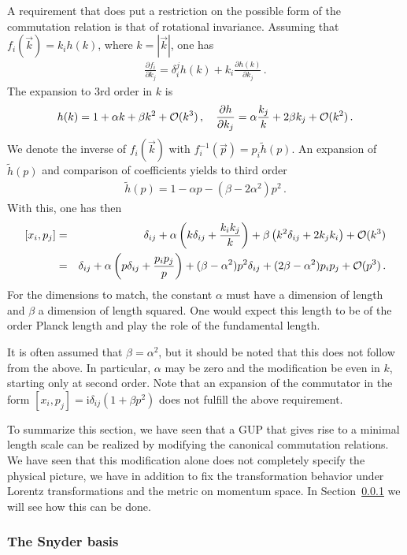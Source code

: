 \documentclass{article}
\def\beqn{\begin{eqnarray}}
\def\eeqn{\end{eqnarray}}
\begin{document}
A requirement that does put a restriction on the possible form of the commutation relation is that 
of rotational invariance. Assuming that $f_i(\vec k) = k_i h(k)$, where $k = |\vec k|$, one has
\beqn
\frac{\partial f_i}{\partial k_j} = \delta_i^j h(k) + k_i \frac{\partial h (k)}{\partial k_j} \,.
\eeqn 
The expansion to 3rd order in $k$ is
\beqn
 h(k) = 1 + \alpha k + \beta k^2 + {\cal{O}}(k^3) \,,\quad \frac{\partial h}{\partial k_j} = \alpha \frac{k_j}{k} + 2 \beta k_j + {\cal{O}}(k^2) \,. 
\eeqn
We denote the inverse of $f_i(\vec k)$ with $f_i^{-1}(\vec p) = p_i \tilde h(p)$. An expansion of $\tilde h(p)$ and comparison
of coefficients yields to third order
\beqn
\tilde h(p) = 1 - \alpha p - (\beta -2\alpha^2) p^2 \,. \label{hinverse}
\eeqn
With this, one has then
\beqn
\left[x_i, p_j \right] &=& \delta_{ij} + \alpha \left( k \delta_{ij} + \frac{k_i k_j}{k} \right) + \beta \left( k^2 \delta_{ij} +2 k_j k_i \right) +   {\cal{O}}(k^3)\nonumber \\
&=& \delta_{ij} + \alpha \left( p \delta_{ij} + \frac{p_i p_j}{p} \right) + (\beta - \alpha^2) p^2 \delta_{ij} + (2 \beta - \alpha^2) p_i p_j +   {\cal{O}}(p^3)\,. \label{param}
\eeqn
For the dimensions to match, the constant $\alpha$ must have a dimension of length and $\beta$ a dimension of length squared. One
would expect this length to be of the order Planck length and play the role of the fundamental length. 

It is often assumed that $\beta = \alpha^2$, %
but it should be noted that
this does not follow from the above. In particular, $\alpha$ may be zero and the 
modification be even in $k$, starting only at second order. Note that an expansion of the commutator in the form
$[x_i,p_j] = \mathrm{i} \delta_{ij}(1 + \beta p^2)$ does not fulfill the above requirement.

To summarize this section, we have seen that a GUP that gives rise to a
minimal length scale can be realized by modifying the canonical commutation relations. We have seen
that this modification alone does not completely specify the physical picture, we have in addition to 
fix the transformation behavior under Lorentz transformations and the metric on momentum space. In Section~\ref{snyderbasis} we will see how this can be done.

\subsubsection{The Snyder basis}
\label{snyderbasis}
\end{document}
